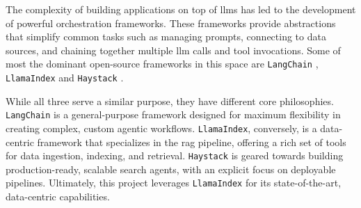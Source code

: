 The complexity of building applications on top of \acp{llm} has led to the development of powerful orchestration frameworks. These frameworks provide abstractions that simplify common tasks such as managing prompts, connecting to data sources, and chaining together multiple \ac{llm} calls and tool invocations. Some of most the dominant open-source frameworks in this space are \texttt{LangChain} \cite{LANGCHAIN}, \texttt{LlamaIndex} \cite{LLAMAINDEX} and \texttt{Haystack} \cite{HAYSTACK}.

While all three serve a similar purpose, they have different core philosophies. \texttt{LangChain} is a general-purpose framework designed for maximum flexibility in creating complex, custom agentic workflows. \texttt{LlamaIndex}, conversely, is a data-centric framework that specializes in the \ac{rag} pipeline, offering a rich set of tools for data ingestion, indexing, and retrieval. \texttt{Haystack} is geared towards building production-ready, scalable search agents, with an explicit focus on deployable pipelines. Ultimately, this project leverages \texttt{LlamaIndex} for its state-of-the-art, data-centric capabilities.